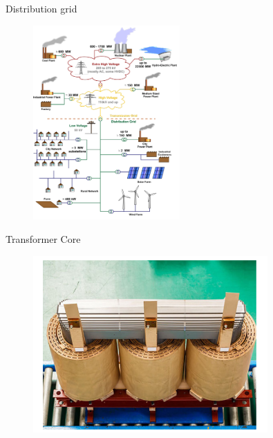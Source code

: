 \documentclass[aspectratio=43]{beamer}
\begin{document}
\begin{frame}[fragile]{Distribution grid} %
\begin{figure}
    \centering
    \includegraphics[width=0.5\textwidth]{figures/distribution grid.png}
    \label{fig:my_label}
\end{figure}
\end{frame}

\begin{frame}[fragile]{Transformer Core} %
\begin{figure}
    \centering
    \includegraphics[width=0.8\textwidth]{figures/transformercore.png}
    \label{fig:my_label}
\end{figure}
\end{frame}
\end{document}
